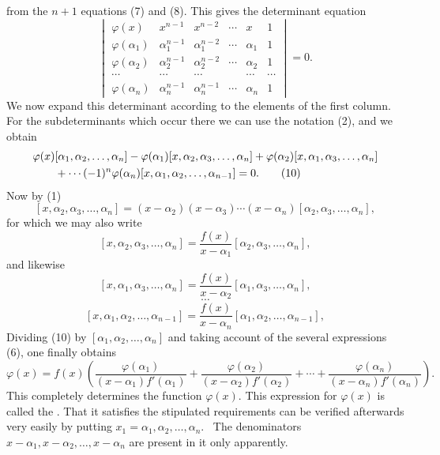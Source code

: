
from the $n+1$ equations (7) and (8). This gives the determinant equation
\[
\begin{vmatrix}
 \varphi(x)&x^{n-1}&x^{n-2}&\cdots&x&1\\
 \varphi(\alpha_1)&\alpha_1^{n-1}&\alpha_1^{n-2}&\cdots&\alpha_1&1\\
 \varphi(\alpha_2)&\alpha_2^{n-1}&\alpha_2^{n-2}&\cdots&\alpha_2&1\\
 \cdots&\cdots&\cdots&&\cdots&\cdots\\
 \varphi(\alpha_n)&\alpha_n^{n-1}&\alpha_n^{n-1}&\cdots&\alpha_n&1%
\end{vmatrix}=0.\tag{9}
\]
We now expand this determinant according to the elements of the first column. For the subdeterminants which occur there we can use the notation (2), and we obtain
\begin{align}
&\varphi(x)[\alpha_1,\alpha_2,\ldots,\alpha_n]
-\varphi(\alpha_1)[x,\alpha_2,\alpha_3,\ldots,\alpha_n]
+\varphi(\alpha_2)[x,\alpha_1,\alpha_3,\ldots,\alpha_n]
\notag\\
&\qquad+\cdots(-1)^n\varphi(\alpha_n)[x,\alpha_1,\alpha_2,\ldots,\alpha_{n-1}]=0.\tag{10}
\end{align}
Now by (1)
\[
 [x,\alpha_2,\alpha_3,
 \ldots,\alpha_n]=(x-\alpha_2)(x-\alpha_3)\cdots(x-\alpha_n)[\alpha_2,\alpha_3,
 \ldots,\alpha_n],
\]
for which we may also write
\[
 [x,\alpha_2,\alpha_3,\ldots,\alpha_n]=\frac{f(x)}{x-\alpha_1}[\alpha_2,\alpha_3,\ldots,\alpha_n],
\]
and likewise
\[
 [x,\alpha_1,\alpha_3,\ldots,\alpha_n]=\frac{f(x)}{x-\alpha_2}[\alpha_1,\alpha_3,\ldots,\alpha_n],
\]
\[\cdots\]
\[
 [x,\alpha_1,\alpha_2,\ldots,\alpha_{n-1}]=\frac{f(x)}{x-\alpha_n}[\alpha_1,\alpha_2,\ldots,\alpha_{n-1}],
\]
Dividing (10) by $[\alpha_1,\alpha_2,
\ldots,\alpha_n]$ and taking account of the several expressions (6), one finally obtains
\begin{equation}
 \varphi(x)=f(x)\left(\frac{\varphi(\alpha_1)}{(x-\alpha_1)f'(\alpha_1)}+\frac{\varphi(\alpha_2)}{(x-\alpha_2)f'(\alpha_2)}+\cdots+\frac{\varphi(\alpha_n)}{(x-\alpha_n)f'(\alpha_n)}\right).\tag{11}
\end{equation}
This completely determines the function $\varphi(x)$. This expression for $\varphi(x)$ is called the . That it satisfies the stipulated requirements can be verified afterwards very easily by putting $x_1=\alpha_1,\alpha_2,
\ldots,\alpha_n$.%
\ The denominators $x-\alpha_1,x-\alpha_2,
\ldots,x-\alpha_n$ are present in it only apparently.
